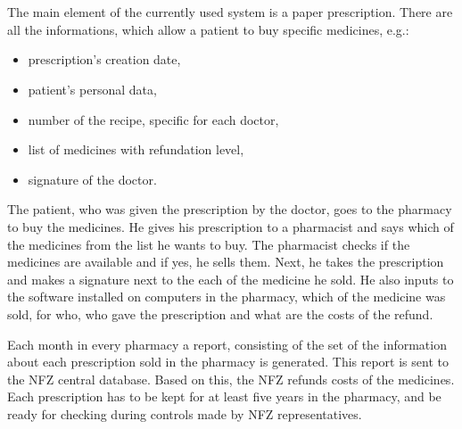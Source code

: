 \chapter{   }

The main element of the currently used system is a paper prescription. There are all the informations, which allow a patient to buy specific medicines, e.g.: 

\begin{itemize}
  \item prescription’s creation date,
  \item patient’s personal data,
  \item number of the recipe, specific for each doctor,
  \item list of medicines with refundation level,
  \item signature of the doctor. 
\end{itemize}

The patient, who was given the prescription by the doctor, goes to the pharmacy to buy the medicines. He gives his prescription to a pharmacist and says which of the medicines from the list he wants to buy. The pharmacist checks if the medicines are available and if yes, he sells them. Next, he takes the prescription and makes a signature next to the each of the medicine he sold. He also inputs to the software installed on computers in the pharmacy, which of the medicine was sold, for who, who gave the prescription and what are the costs of the refund.

Each month in every pharmacy a report, consisting of  the set of the information about each prescription sold in the pharmacy is generated. This report is sent to the NFZ central database. Based on this, the NFZ refunds costs of the medicines. Each prescription has to be kept for at least five years in the pharmacy, and be ready for checking during controls made by NFZ representatives. 



